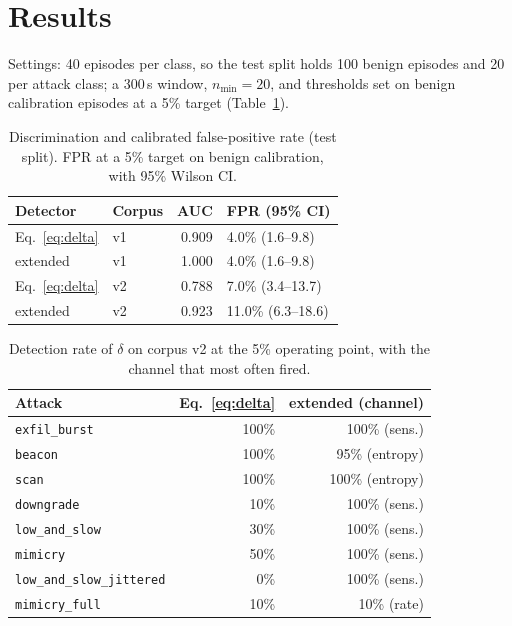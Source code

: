 \documentclass[conference]{IEEEtran}
\theoremstyle{remark}
\begin{document}
\section{Results}\label{sec:results}
Settings: 40 episodes per class, so the test split holds 100 benign episodes and 20 per attack class; a 300\,s window, $n_{\min}=20$, and thresholds set on benign calibration episodes at a 5\% target (Table~\ref{tab:auc}).

\begin{table}[t]
\centering
\caption{Discrimination and calibrated false-positive rate (test split). FPR at a 5\% target on benign calibration, with 95\% Wilson CI.}
\label{tab:auc}
\begin{tabular}{llrl}
\toprule
Detector & Corpus & AUC & FPR (95\% CI)\\
\midrule
Eq.~\eqref{eq:delta} & v1 & 0.909 & 4.0\% (1.6--9.8)\\
extended & v1 & 1.000 & 4.0\% (1.6--9.8)\\
Eq.~\eqref{eq:delta} & v2 & 0.788 & 7.0\% (3.4--13.7)\\
extended & v2 & 0.923 & 11.0\% (6.3--18.6)\\
\bottomrule
\end{tabular}
\end{table}

\begin{table}[t]
\centering
\caption{Detection rate of $\delta$ on corpus v2 at the 5\% operating point, with the channel that most often fired.}
\label{tab:tpr}
\begin{tabular}{lrr}
\toprule
Attack & Eq.~\eqref{eq:delta} & extended (channel)\\
\midrule
\texttt{exfil\_burst} & 100\% & 100\% (sens.)\\
\texttt{beacon} & 100\% & 95\% (entropy)\\
\texttt{scan} & 100\% & 100\% (entropy)\\
\texttt{downgrade} & 10\% & 100\% (sens.)\\
\texttt{low\_and\_slow} & 30\% & 100\% (sens.)\\
\texttt{mimicry} & 50\% & 100\% (sens.)\\
\texttt{low\_and\_slow\_jittered} & 0\% & 100\% (sens.)\\
\texttt{mimicry\_full} & 10\% & 10\% (rate)\\
\bottomrule
\end{tabular}
\end{table}
\end{document}
